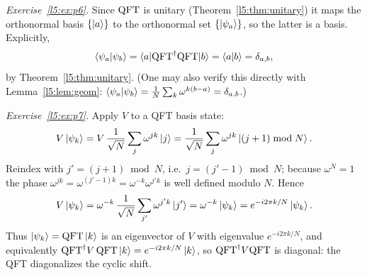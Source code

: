 \begin{solution}
\medskip
\textit{Exercise~\ref{l5:ex:p6}.} Since $\mathrm{QFT}$ is unitary
(Theorem~\ref{l5:thm:unitary}) it maps the orthonormal basis $\{\ket{a}\}$ to the
orthonormal set $\{\ket{\psi_a}\}$, so the latter is a basis. Explicitly,
\[
  \braket{\psi_a|\psi_b}
   = \braket{a|\mathrm{QFT}^{\dagger}\mathrm{QFT}|b} = \braket{a|b} = \delta_{a,b},
\]
by Theorem~\ref{l5:thm:unitary}. (One may also verify this directly with
Lemma~\ref{l5:lem:geom}: $\braket{\psi_a|\psi_b} = \tfrac1N\sum_k
\omega^{k(b-a)} = \delta_{a,b}$.)

\medskip
\textit{Exercise~\ref{l5:ex:p7}.} Apply $V$ to a QFT basis state:
\[
  V\ket{\psi_k}
   = V\,\frac{1}{\sqrt N}\sum_{j}\omega^{jk}\ket{j}
   = \frac{1}{\sqrt N}\sum_{j}\omega^{jk}\ket{(j+1)\bmod N}.
\]
Reindex with $j' = (j+1)\bmod N$, i.e.\ $j = (j'-1)\bmod N$; because
$\omega^{N}=1$ the phase $\omega^{jk} = \omega^{(j'-1)k} =
\omega^{-k}\omega^{j'k}$ is well defined modulo $N$. Hence
\[
  V\ket{\psi_k} = \omega^{-k}\,\frac{1}{\sqrt N}\sum_{j'}\omega^{j'k}\ket{j'}
   = \omega^{-k}\ket{\psi_k} = e^{-i2\pi k/N}\ket{\psi_k}.
\]
Thus $\ket{\psi_k}=\mathrm{QFT}\ket{k}$ is an eigenvector of $V$ with eigenvalue
$e^{-i2\pi k/N}$, and equivalently $\mathrm{QFT}^{\dagger} V\,\mathrm{QFT}\ket{k} =
e^{-i2\pi k/N}\ket{k}$, so $\mathrm{QFT}^{\dagger} V\mathrm{QFT}$ is diagonal: the QFT
diagonalizes the cyclic shift.
\end{solution}
